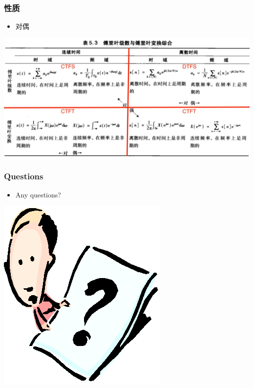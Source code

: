 \documentclass[CJKutf8,xcolor=pdftex,dvipsnames,table]{beamer}
\begin{document}
\begin{CJK*}{UTF8}{song}
  \begin{frame}
    \frametitle{性质}
    \begin{itemize}
    \item 对偶
    \end{itemize}
    \begin{center}
      \includegraphics[scale=.32]{ss-c-t5-3}
    \end{center}
  \end{frame}  
  	        
  \begin{frame}
    \frametitle{Questions}
    \begin{itemize}
    \item Any questions?
    \end{itemize}
    \begin{center}
      \includegraphics[scale=.5]{question}
    \end{center}
  \end{frame} 
  	        
\end{CJK*}
\end{document}
